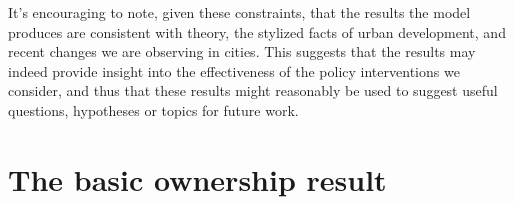 It's encouraging to note, given these constraints, that the results the model produces are consistent with theory, the stylized facts of urban development, and recent changes we are observing in cities. 
This suggests that the results may indeed provide insight into the effectiveness of the policy interventions we consider, and thus that these results might reasonably be used to suggest useful questions, hypotheses or topics for future work. 


%







\section{The basic ownership result}








